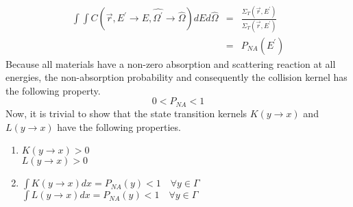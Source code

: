\begin{eqnarray}
  \int\int C(\vec{r},E^{'} \to E,\hat{\Omega^{'}} \to \hat{\Omega}) 
  dEd\hat{\Omega} & = & \frac{\Sigma_T(\vec{r},E^{'})}{\Sigma_T(\vec{r},E^{'})}
  \label{eq:collision_op_prop} \\
  & = & P_{NA}(E^{'}) \nonumber 
\end{eqnarray}
Because all materials have a non-zero absorption and scattering reaction
at all energies, the non-absorption probability and consequently the 
collision kernel has the following property.
\begin{equation*}
  0 < P_{NA} < 1
\end{equation*}
Now, it is trivial to show that the state transition kernels $K(y \to x)$ and
$L(y \to x)$ have the following properties.
\begin{enumerate}
  \item $K(y \to x) > 0$ \\
    $L(y \to x) > 0$
  \item $\int K(y \to x)dx = P_{NA}(y) < 1 \quad \forall y \in \Gamma$ \\
    $\int L(y \to x)dx = P_{NA}(y) < 1 \quad \forall y \in \Gamma$
\end{enumerate}

